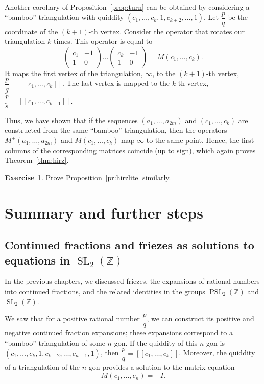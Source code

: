 \documentclass[a4paper,11pt]{amsart}
\newcommand{\ZZ}{{\mathbb{Z}}}
\newcommand{\SL}{\mathop{\mathrm{SL}}}
\newcommand{\PSL}{\mathop{\mathrm{PSL}}}
\theoremstyle{plain}
\theoremstyle{remark}
\theoremstyle{definition}
\newtheorem{exercise}[theorem]{Exercise}
\numberwithin{equation}{section}
\numberwithin{figure}{section}
\begin{document}
Another corollary of Proposition~\ref{prop:turn} can be obtained by considering a ``bamboo'' triangulation with quiddity $(c_1,\dots,c_k,1,c_{k+2},\dots,1)$. Let $\dfrac pq$ be the coordinate of the $(k+1)$-th vertex. Consider the operator that rotates our triangulation $k$ times. This operator is equal to
\[
\begin{pmatrix}c_1 &-1\\1& 0\end{pmatrix}\dots \begin{pmatrix}c_k &-1\\1& 0\end{pmatrix}=M(c_1,\dots,c_k).
\] 
It maps the first vertex of the triangulation, $\infty$, to the $(k+1)$-th vertex, $\dfrac pq=[[c_1,\dots,c_k]]$. The last vertex is mapped to the $k$-th vertex, $\dfrac {\tilde{r}}{\tilde{s}}=[[c_1,\dots,c_{k-1}]]$.

Thus, we have shown that if the sequences $(a_1,\dots,a_{2m})$ and $(c_1,\dots,c_k)$ are constructed from the same ``bamboo'' triangulation, then the operators $M^+(a_1,\dots,a_{2m})$ and $M(c_1,\dots,c_k)$ map $\infty$ to the same point. Hence, the first columns of the corresponding matrices coincide (up to sign), which again proves Theorem~\ref{thm:hirz}.

\begin{exercise}
Prove Proposition~\ref{pr:hirzlite} similarly.
\end{exercise}


\section{Summary and further steps}

\subsection{Continued fractions and friezes as solutions to equations in $\SL_2(\ZZ)$}

In the previous chapters, we discussed friezes, the expansions of rational numbers into continued fractions, and the related identities in the groups $\PSL_2(\ZZ)$ and $\SL_2(\ZZ)$. 

We saw that for a positive rational number $\dfrac pq$, we can construct its positive and negative continued fraction expansions; these expansions correspond to a ``bamboo'' triangulation of some $n$-gon. If the quiddity of this $n$-gon is $(c_1,\dots,c_k,1,c_{k+2},\dots,c_{n-1},1)$, then $\dfrac pq=[[c_1,\dots,c_k]]$. Moreover, the quiddity of  a triangulation of the $n$-gon provides a solution to the matrix equation
\[
M(c_1,\dots,c_n)=-I.
\]
\end{document}
